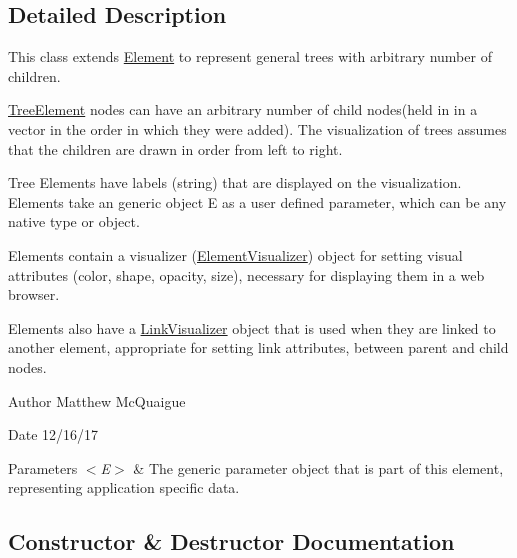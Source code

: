 \subsection{Detailed Description}
This class extends \mbox{\hyperlink{namespace_bridges_1_1_element}{Element}} to represent general trees with arbitrary number of children. 

\mbox{\hyperlink{class_bridges_1_1_tree_element_1_1_tree_element}{Tree\+Element}} nodes can have an arbitrary number of child nodes(held in in a vector in the order in which they were added). The visualization of trees assumes that the children are drawn in order from left to right.

Tree Elements have labels (string) that are displayed on the visualization. Elements take an generic object E as a user defined parameter, which can be any native type or object.

Elements contain a visualizer (\mbox{\hyperlink{namespace_bridges_1_1_element_visualizer}{Element\+Visualizer}}) object for setting visual attributes (color, shape, opacity, size), necessary for displaying them in a web browser.

Elements also have a \mbox{\hyperlink{namespace_bridges_1_1_link_visualizer}{Link\+Visualizer}} object that is used when they are linked to another element, appropriate for setting link attributes, between parent and child nodes.

\begin{DoxyAuthor}{Author}
Matthew Mc\+Quaigue
\end{DoxyAuthor}
\begin{DoxyDate}{Date}
12/16/17
\end{DoxyDate}

\begin{DoxyParams}{Parameters}
{\em $<$\+E$>$} & The generic parameter object that is part of this element, representing application specific data. \\
\hline
\end{DoxyParams}


\subsection{Constructor \& Destructor Documentation}
\mbox{\label{class_bridges_1_1_tree_element_1_1_tree_element_a523764e27ed94055175b22574b730046}} 
